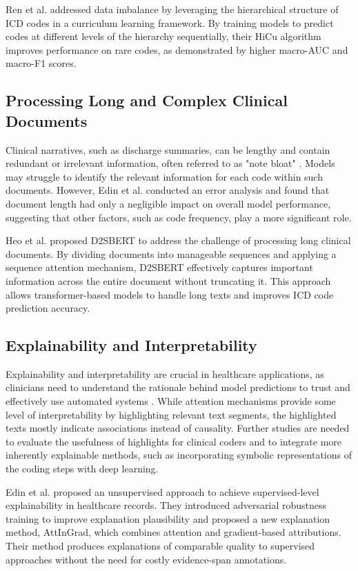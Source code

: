 \documentclass[12pt,a4paper]{report}
\begin{document}
Ren et al. \cite{ren2022hicu} addressed data imbalance by leveraging the hierarchical structure of ICD codes in a curriculum learning framework. By training models to predict codes at different levels of the hierarchy sequentially, their HiCu algorithm improves performance on rare codes, as demonstrated by higher macro-AUC and macro-F1 scores.

\subsection{Processing Long and Complex Clinical Documents}

Clinical narratives, such as discharge summaries, can be lengthy and contain redundant or irrelevant information, often referred to as "note bloat" \cite{wrenn2010quantifying}. Models may struggle to identify the relevant information for each code within such documents. However, Edin et al. \cite{edin2023automated} conducted an error analysis and found that document length had only a negligible impact on overall model performance, suggesting that other factors, such as code frequency, play a more significant role.

Heo et al. \cite{heo2022medical} proposed D2SBERT to address the challenge of processing long clinical documents. By dividing documents into manageable sequences and applying a sequence attention mechanism, D2SBERT effectively captures important information across the entire document without truncating it. This approach allows transformer-based models to handle long texts and improves ICD code prediction accuracy.

\subsection{Explainability and Interpretability}

Explainability and interpretability are crucial in healthcare applications, as clinicians need to understand the rationale behind model predictions to trust and effectively use automated systems \cite{holzinger2017we}. While attention mechanisms provide some level of interpretability by highlighting relevant text segments, the highlighted texts mostly indicate associations instead of causality. Further studies are needed to evaluate the usefulness of highlights for clinical coders and to integrate more inherently explainable methods, such as incorporating symbolic representations of the coding steps with deep learning.

Edin et al. \cite{edin2024unsupervised} proposed an unsupervised approach to achieve supervised-level explainability in healthcare records. They introduced adversarial robustness training to improve explanation plausibility and proposed a new explanation method, AttInGrad, which combines attention and gradient-based attributions. Their method produces explanations of comparable quality to supervised approaches without the need for costly evidence-span annotations.
\end{document}

